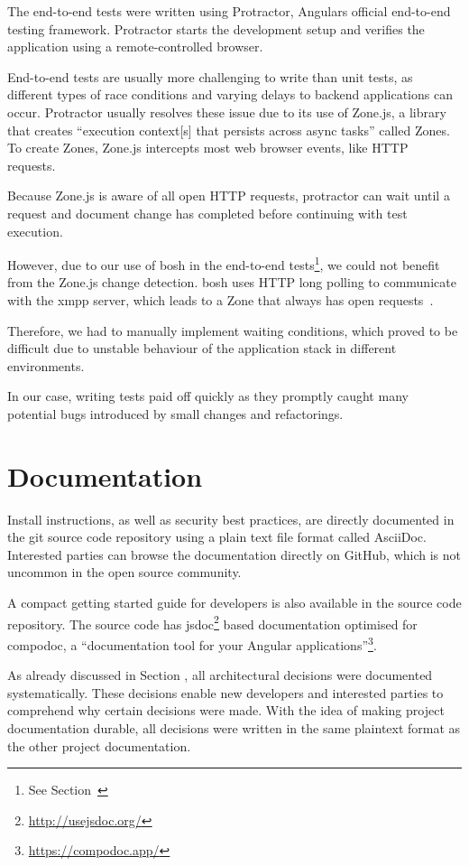 The end-to-end tests were written using Protractor, Angulars official end-to-end testing framework.
Protractor starts the development setup and verifies the application using a remote-controlled browser.

End-to-end tests are usually more challenging to write than unit tests, as different types of race conditions and varying delays to backend applications can occur.
Protractor usually resolves these issue due to its use of Zone.js, a library that creates ``execution context[s] that persists across async tasks'' called Zones.
To create Zones, Zone.js intercepts most web browser events, like HTTP requests.~\cite{zone-js-readme}

Because Zone.js is aware of all open HTTP requests, protractor can wait until a request and document change has completed before continuing with test execution.

However, due to our use of \gls{bosh} in the end-to-end tests\footnote{See Section~}, we could not benefit from the Zone.js change detection.
\gls{bosh} uses HTTP long polling to communicate with the \gls{xmpp} server, which leads to a Zone that always has open requests~\cite{xep-0124}.

Therefore, we had to manually implement waiting conditions, which proved to be difficult due to unstable behaviour of the application stack in different environments.

In our case, writing tests paid off quickly as they promptly caught many potential bugs introduced by small changes and refactorings.

\section{Documentation}

Install instructions, as well as security best practices, are directly documented in the git source code repository using a plain text file format called AsciiDoc.
Interested parties can browse the documentation directly on GitHub, which is not uncommon in the open source community.

A compact getting started guide for developers is also available in the source code repository.
The source code has jsdoc\footnote{\url{http://usejsdoc.org/}} based documentation optimised for compodoc, a ``documentation tool for your Angular applications''\footnote{\url{https://compodoc.app/}}.

As already discussed in Section , all architectural decisions were documented systematically.
These decisions enable new developers and interested parties to comprehend why certain decisions were made.
With the idea of making project documentation durable, all decisions were written in the same plaintext format as the other project documentation.
